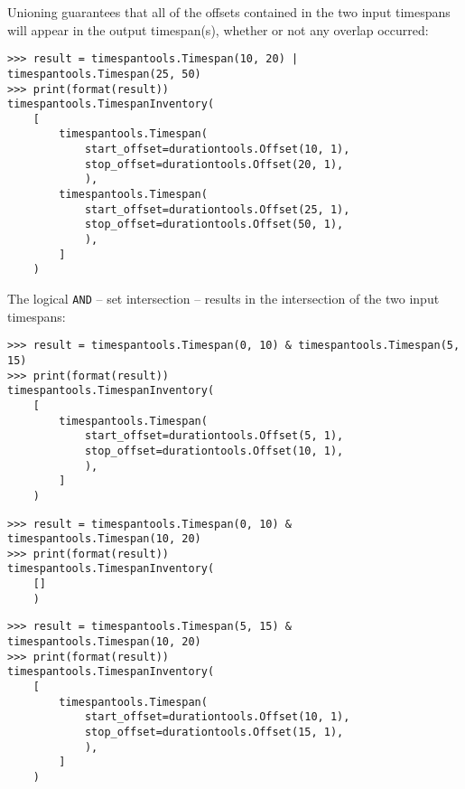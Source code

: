 \noindent Unioning guarantees that all of the offsets contained in the two
input timespans will appear in the output timespan(s), whether or not any
overlap occurred:

\begin{comment}
<abjad>
result = timespantools.Timespan(10, 20) | timespantools.Timespan(25, 50)
print(format(result))
</abjad>
\end{comment}

\begin{singlespacing}
\vspace{-0.5\baselineskip}
\begin{lstlisting}
>>> result = timespantools.Timespan(10, 20) | timespantools.Timespan(25, 50)
>>> print(format(result))
timespantools.TimespanInventory(
    [
        timespantools.Timespan(
            start_offset=durationtools.Offset(10, 1),
            stop_offset=durationtools.Offset(20, 1),
            ),
        timespantools.Timespan(
            start_offset=durationtools.Offset(25, 1),
            stop_offset=durationtools.Offset(50, 1),
            ),
        ]
    )
\end{lstlisting}
\end{singlespacing}

\noindent The logical \texttt{AND} -- set intersection -- results in the
intersection of the two input timespans:

\begin{comment}
<abjad>
result = timespantools.Timespan(0, 10) & timespantools.Timespan(5, 15)
print(format(result))
result = timespantools.Timespan(0, 10) & timespantools.Timespan(10, 20)
print(format(result))
result = timespantools.Timespan(5, 15) & timespantools.Timespan(10, 20)
print(format(result))
</abjad>
\end{comment}

\begin{singlespacing}
\vspace{-0.5\baselineskip}
\begin{lstlisting}
>>> result = timespantools.Timespan(0, 10) & timespantools.Timespan(5, 15)
>>> print(format(result))
timespantools.TimespanInventory(
    [
        timespantools.Timespan(
            start_offset=durationtools.Offset(5, 1),
            stop_offset=durationtools.Offset(10, 1),
            ),
        ]
    )
\end{lstlisting}
\begin{lstlisting}
>>> result = timespantools.Timespan(0, 10) & timespantools.Timespan(10, 20)
>>> print(format(result))
timespantools.TimespanInventory(
    []
    )
\end{lstlisting}
\begin{lstlisting}
>>> result = timespantools.Timespan(5, 15) & timespantools.Timespan(10, 20)
>>> print(format(result))
timespantools.TimespanInventory(
    [
        timespantools.Timespan(
            start_offset=durationtools.Offset(10, 1),
            stop_offset=durationtools.Offset(15, 1),
            ),
        ]
    )
\end{lstlisting}
\end{singlespacing}

